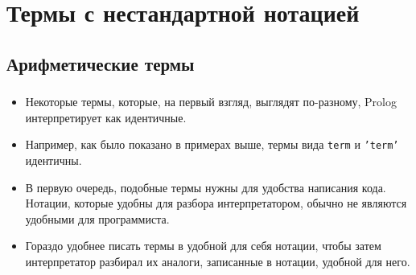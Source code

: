 

\section{Термы с нестандартной нотацией}

\begin{frame}

	\begin{center}
		\Huge \insertsection
	\end{center}

\end{frame}


\subsection{Арифметические термы}


\begin{frame}

	\frametitle{\insertsection}

	\begin{itemize}
		\item Некоторые термы, которые, на первый взгляд, выглядят по-разному, Prolog интерпретирует как идентичные.
		\item Например, как было показано в примерах выше, термы вида \texttt{term} и \texttt{'term'} идентичны.
		\item В первую очередь, подобные термы нужны для удобства написания кода. Нотации, которые удобны для разбора интерпретатором, обычно не являются удобными для программиста.
		\item Гораздо удобнее писать термы в удобной для себя нотации, чтобы затем интерпретатор разбирал их аналоги, записанные в нотации, удобной для него.
	\end{itemize}

\end{frame}


